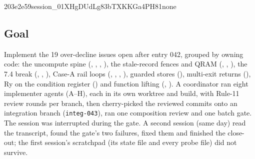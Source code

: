 %
  {203e2e59}{session\_01XHgDUdLg83bTXKKGa4PH81}{none}

\subsection*{Goal}
Implement the 19 over-decline issues open after entry 042, grouped by owning code: the
uncompute spine (, , , ),
the stale-record fences and QRAM (, , ), the 7.4 break
(, , ), Case-A rail loops (, ,
, ), guarded stores (), multi-exit returns (), Ry
on the condition register () and function lifting (, ).
A coordinator ran eight implementer agents (A--H), each in its own worktree and build,
with Rule-11 review rounds per branch, then cherry-picked the reviewed commits onto an
integration branch (\texttt{integ-043}), ran one composition review and one batch gate.
The session was interrupted during the gate. A second session (same day) read the
transcript, found the gate's two failures, fixed them and finished the close-out; the
first session's scratchpad (its state file and every probe file) did not survive.

